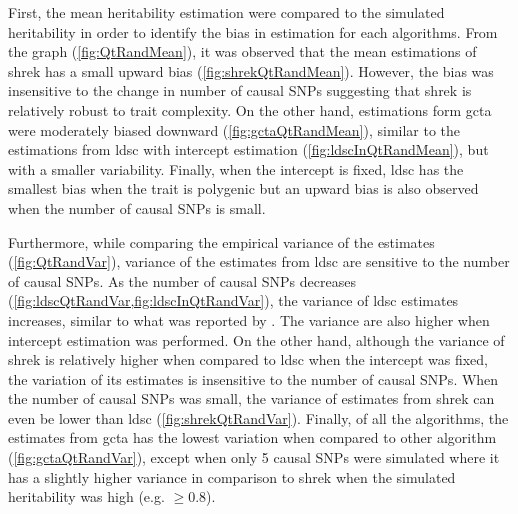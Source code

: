 		First, the mean heritability estimation were compared to the simulated heritability in order to identify the bias in estimation for each algorithms.
		From the graph (\cref{fig:QtRandMean}), it was observed that the mean estimations of \gls{shrek} has a small upward bias (\cref{fig:shrekQtRandMean}).
		However, the bias was insensitive to the change in number of causal \glspl{SNP} suggesting that \gls{shrek} is relatively robust to trait complexity.
		On the other hand, estimations form \gls{gcta} were moderately biased downward (\cref{fig:gctaQtRandMean}), similar to the estimations from \gls{ldsc} with intercept estimation (\cref{fig:ldscInQtRandMean}), but with a smaller variability.
		Finally, when the intercept is fixed, \gls{ldsc} has the smallest bias when the trait is polygenic but an upward bias is also observed when the number of causal \glspl{SNP} is small.
		
		Furthermore, while comparing the empirical variance of the estimates (\cref{fig:QtRandVar}), variance of the estimates from \gls{ldsc} are sensitive to the number of causal \glspl{SNP}.
		As the number of causal \glspl{SNP} decreases (\cref{fig:ldscQtRandVar,fig:ldscInQtRandVar}), the variance of \gls{ldsc} estimates increases, similar to what was reported by \citet{Bulik-Sullivan2015}.
		The variance are also higher when intercept estimation was performed. 
		On the other hand, although the variance of \gls{shrek} is relatively higher when compared to \gls{ldsc} when the intercept was fixed, the variation of its estimates is insensitive to the number of causal \glspl{SNP}.
		When the number of causal \glspl{SNP} was small, the variance of estimates from \gls{shrek} can even be lower than \gls{ldsc} (\cref{fig:shrekQtRandVar}).
		Finally, of all the algorithms, the estimates from \gls{gcta} has the lowest variation when compared to other algorithm (\cref{fig:gctaQtRandVar}), except when only 5 causal \glspl{SNP} were simulated where it has a slightly higher variance in comparison to \gls{shrek} when the simulated heritability was high (e.g. $\ge 0.8$).
		
